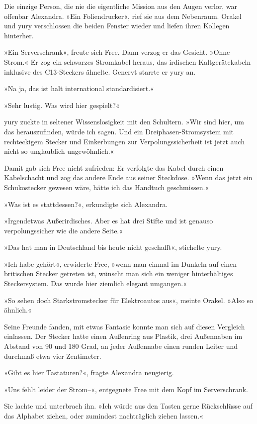 Die einzige Person, die nie die eigentliche Mission aus den Augen verlor, war offenbar Alexandra. »Ein Foliendrucker«, rief sie aus dem Nebenraum. Orakel und yury verschlossen die beiden Fenster wieder und liefen ihren Kollegen hinterher.

»Ein Serverschrank«, freute sich Free. Dann verzog er das Gesicht. »Ohne Strom.« Er zog ein schwarzes Stromkabel heraus, das irdischen Kaltgerätekabeln inklusive des C13-Steckers ähnelte. Genervt starrte er yury an.

»Na ja, das ist halt international standardisiert.«

»Sehr lustig. Was wird hier gespielt?«

yury zuckte in seltener Wissenslosigkeit mit den Schultern. »Wir sind hier, um das herauszufinden, würde ich sagen. Und ein Dreiphasen-Stromsystem mit rechteckigem Stecker und Einkerbungen zur Verpolungssicherheit ist jetzt auch nicht so unglaublich ungewöhnlich.«

Damit gab sich Free nicht zufrieden: Er verfolgte das Kabel durch einen Kabelschacht und zog das andere Ende aus seiner Steckdose. »Wenn das jetzt ein Schukostecker gewesen wäre, hätte ich das Handtuch geschmissen.«

»Was ist es stattdessen?«, erkundigte sich Alexandra.

»Irgendetwas Außerirdisches. Aber es hat drei Stifte und ist genauso verpolungssicher wie die andere Seite.«

»Das hat man in Deutschland bis heute nicht geschafft«, stichelte yury.

»Ich habe gehört«, erwiderte Free, »wenn man einmal im Dunkeln auf einen britischen Stecker getreten ist, wünscht man sich ein weniger hinterhältiges Steckersystem. Das wurde hier ziemlich elegant umgangen.«

»So sehen doch Starkstromstecker für Elektroautos aus«, meinte Orakel. »Also so ähnlich.«

Seine Freunde fanden, mit etwas Fantasie konnte man sich auf diesen Vergleich einlassen. Der Stecker hatte einen Außenring aus Plastik, drei Außennaben im Abstand von 90 und 180 Grad, an jeder Außennabe einen runden Leiter und durchmaß etwa vier Zentimeter.

»Gibt es hier Tastaturen?«, fragte Alexandra neugierig.

»Uns fehlt leider der Strom–«, entgegnete Free mit dem Kopf im Serverschrank.

Sie lachte und unterbrach ihn. »Ich würde aus den Tasten gerne Rückschlüsse auf das Alphabet ziehen, oder zumindest nachträglich ziehen lassen.«

